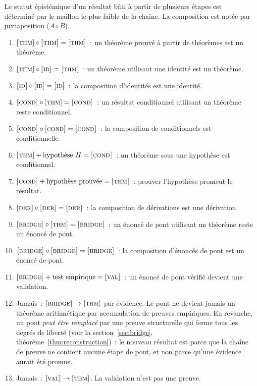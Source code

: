 \documentclass[12pt,a4paper]{article}
\begin{document}
Le statut épistémique d'un résultat bâti à partir de plusieurs
étapes est déterminé par le maillon le plus faible de la chaîne.
La composition est notée par juxtaposition ($A \circ B$).

\begin{enumerate}[leftmargin=*, label=\textbf{R\arabic*.}]
\item $\textnormal{\textsc{[thm]}} \circ \textnormal{\textsc{[thm]}} = \textnormal{\textsc{[thm]}}$~:
  un théorème prouvé à partir de théorèmes est un théorème.
\item $\textnormal{\textsc{[thm]}} \circ \textnormal{\textsc{[id]}} = \textnormal{\textsc{[thm]}}$~:
  un théorème utilisant une identité est un théorème.
\item $\textnormal{\textsc{[id]}} \circ \textnormal{\textsc{[id]}} = \textnormal{\textsc{[id]}}$~:
  la composition d'identités est une identité.
\item $\textnormal{\textsc{[cond]}} \circ \textnormal{\textsc{[thm]}} = \textnormal{\textsc{[cond]}}$~:
  un résultat conditionnel utilisant un théorème reste
  conditionnel.
\item $\textnormal{\textsc{[cond]}} \circ \textnormal{\textsc{[cond]}} = \textnormal{\textsc{[cond]}}$~:
  la composition de conditionnels est conditionnelle.
\item $\textnormal{\textsc{[thm]}} + \text{hypothèse } H = \textnormal{\textsc{[cond]}}$~:
  un théorème sous une hypothèse est conditionnel.
\item $\textnormal{\textsc{[cond]}} + \text{hypothèse prouvée} = \textnormal{\textsc{[thm]}}$~:
  prouver l'hypothèse promeut le résultat.
\item $\textnormal{\textsc{[der]}} \circ \textnormal{\textsc{[der]}} = \textnormal{\textsc{[der]}}$~:
  la composition de dérivations est une dérivation.
\item $\textnormal{\textsc{[bridge]}} \circ \textnormal{\textsc{[thm]}} = \textnormal{\textsc{[bridge]}}$~:
  un énoncé de pont utilisant un théorème reste un énoncé de pont.
\item $\textnormal{\textsc{[bridge]}} \circ \textnormal{\textsc{[bridge]}} = \textnormal{\textsc{[bridge]}}$~:
  la composition d'énoncés de pont est un énoncé de pont.
\item $\textnormal{\textsc{[bridge]}} + \text{test empirique} = \textnormal{\textsc{[val]}}$~:
  un énoncé de pont vérifié devient une validation.
\item Jamais~: $\textnormal{\textsc{[bridge]}} \to \textnormal{\textsc{[thm]}}$ par évidence.
  Le pont ne devient jamais un théorème arithmétique par
  accumulation de preuves empiriques.
  En revanche, un pont \emph{peut être remplacé} par une preuve
  structurelle qui ferme tous les degrés de liberté (voir la
  section~\ref{sec:bridge},
  théorème~\ref{thm:reconstruction})~: le nouveau résultat est
  \THMTAG{} parce que la chaîne de preuve ne contient aucune étape
  de pont, et non parce qu'une évidence aurait été promue.
\item Jamais~: $\textnormal{\textsc{[val]}} \to \textnormal{\textsc{[thm]}}$.
  La validation n'est pas une preuve.
\end{enumerate}
\end{document}
